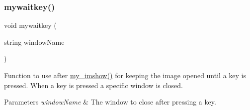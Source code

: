\mbox{\label{utils_8hh_a31ae190fba03c3a422a13a4271e0e424}} 
\subsubsection{\texorpdfstring{mywaitkey()}{mywaitkey()}\hspace{0.1cm}{\footnotesize\ttfamily [2/2]}}
{\footnotesize\ttfamily void mywaitkey (\begin{DoxyParamCaption}\item[{string}]{window\+Name }\end{DoxyParamCaption})}



Function to use after \mbox{\hyperlink{utils_8hh_aabfea83501dfccfa4c420b8c19ceefd7}{my\+\_\+imshow()}} for keeping the image opened until a key is pressed. When a key is pressed a specific window is closed. 


\begin{DoxyParams}{Parameters}
{\em window\+Name} & The window to close after pressing a key. \\
\hline
\end{DoxyParams}
